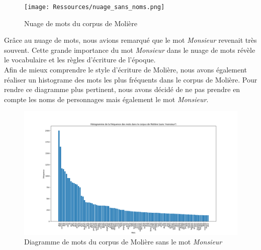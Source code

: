 \begin{figure}[htbp]
    \centering
    \texttt{[image: Ressources/nuage\_sans\_noms.png]}
    \caption{Nuage de mots du corpus de Molière}
    \label{fig:images}
  \end{figure}

\vspace{\baselineskip}

\hspace{0,5cm}Grâce au nuage de mots, nous avions remarqué que le mot \textit{Monsieur}
revenait très souvent. Cette grande importance du mot \textit{Monsieur} dans le
nuage de mots révèle le vocabulaire et les règles d'écriture de l'époque.
\\Afin de mieux comprendre le style d'écriture de Molière, nous avons également
réaliser un histograme des mots les plus fréquents dans le corpus de Molière.
Pour rendre ce diagramme plus pertinent, nous avons décidé de ne pas prendre en
compte les noms de personnages mais également le mot \textit{Monsieur}.

\begin{figure}[htbp]
    \centering
    \includegraphics[width=13cm]{Ressources/diagr_sans_noms_mosn.png}
    \caption{Diagramme de mots du corpus de Molière sans le mot \textit{Monsieur}}
    \label{fig:images}
  \end{figure}

  \vspace{\baselineskip}

